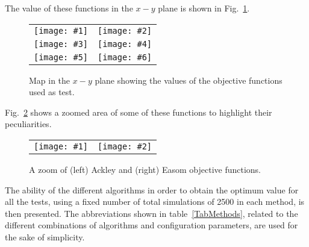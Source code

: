 \documentclass[review,authoryear]{elsarticle}
\newcommand{\TABLE}[5]
{
	\begin{table}[ht!]
		\centering
		\caption{#4.\label{#5}}
		#1
		\begin{tabular}{#2}
			#3
		\end{tabular}
	\end{table}
}
\newcommand{\PLOTII}[4]
{
	\begin{figure}[ht!]
		\centering
		\begin{tabular}{cc}
			\texttt{[image: \#1]} & \texttt{[image: \#2]}
		\end{tabular}
		\caption{#3.\label{#4}}
	\end{figure}
}
\newcommand{\FIGVI}[8]
{
	\begin{figure}[ht!]
		\centering
		\begin{tabular}{cc}
			\texttt{[image: \#1]} & \texttt{[image: \#2]} \\
			\texttt{[image: \#3]} & \texttt{[image: \#4]} \\
			\texttt{[image: \#5]} & \texttt{[image: \#6]}
		\end{tabular}
		\caption{#7.\label{#8}}
	\end{figure}
}
\begin{document}
The value of these functions in the $x-y$ plane is shown in Fig.~\ref{FigTests}.
\FIGVI{Sphere.eps}{Ackley.eps}{Booth.eps}{Rosenbrock.eps}{Easom.eps}{Beale.eps}
{Map in the $x-y$ plane showing the values of the objective functions used as 
test}{FigTests}
Fig.~\ref{FigTestsZoom} shows a zoomed area of some of these functions to 
highlight their peculiarities.
\PLOTII{Ackley2.eps}{Easom2.eps}{A zoom of (left) Ackley and (right) Easom
objective functions}{FigTestsZoom}

The ability of the different algorithms in order to obtain the optimum
value for all the tests, using a fixed number of total simulations of 2500 in each method,
is then presented. The abbreviations shown in table~\ref{TabMethods}, related 
to the different combinations of algorithms and configuration parameters, are used
for the sake of simplicity.
\end{document}
